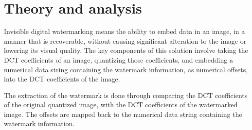 \section{Theory and analysis}\label{sec:t-and-a}
Invisible digital watermarking means the ability to embed data in an image, in a manner that is recoverable, without causing significant alteration to the image or lowering its visual quality.
The key components of this solution involve taking the DCT coefficients of an image, quantizing those coefficients, and embedding a numerical data string containing the watermark information, as numerical offsets, into the DCT coefficients of the image.

The extraction of the watermark is done through comparing the DCT coefficients of the original quantized image, with the DCT coefficients of the watermarked image.
The offsets are mapped back to the numerical data string containing the watermark information.

